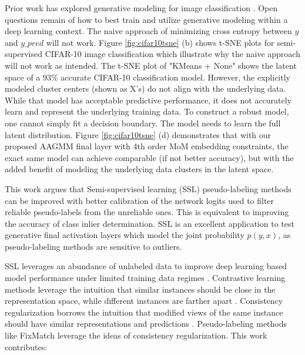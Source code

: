 \documentclass[10pt,twocolumn,letterpaper]{article}
\begin{document}
Prior work has explored generative modeling for image classification \cite{li2019disentangled,kingma2013auto,kingma2019introduction}.
Open questions remain of how to best train and utilize generative modeling within a deep learning context.
The naive approach of minimizing cross entropy between $y$ and $y\_pred$ will not work.
Figure \ref{fig:cifar10tsne} (b) shows t-SNE plots for semi-supervised CIFAR-10 \cite{cifar10} image classification which illustrate why the naive approach will not work as intended. 
The t-SNE\cite{tsne} plot of "KMeans + None" shows the latent space of a $93\%$ accurate CIFAR-10 classification model. 
However, the explicitly modeled cluster centers (shown as X's) do not align with the underlying data.
While that model has acceptable predictive performance, it does not accurately learn and represent the underlying training data.
To construct a robust model, one cannot simply fit a decision boundary.
The model needs to learn the full latent distribution. 
Figure \ref{fig:cifar10tsne} (d) demonstrates that with our proposed AAGMM final layer with 4th order MoM embedding constraints, the exact same model can achieve comparable (if not better accuracy), but with the added benefit of modeling the underlying data clusters in the latent space.


This work argues that Semi-supervised learning (SSL) pseudo-labeling methods can be improved with better calibration of the network logits used to filter reliable pseudo-labels from the unreliable ones. 
This is equivalent to improving the accuracy of class inlier determination.
SSL is an excellent application to test generative final activation layers which model the joint probability $p(y,x)$, as pseudo-labeling methods are sensitive to outliers.

SSL leverages an abundance of unlabeled data to improve deep learning based model performance under limited training data regimes \cite{zhu2022introduction,li2019safe,hady2013semi}.
Contrastive learning methods leverage the intuition that similar instances should be close in the representation space, while different instances are farther apart \cite{yang2022class,li2021comatch}.
Consistency regularization borrows the intuition that modified views of the same instance should have similar representations and predictions \cite{sohn2020fixmatch,lee2022contrastive,zhang2021flexmatch,kim2022conmatch}.
Pseudo-labeling methods like FixMatch \cite{sohn2020fixmatch} leverage the ideas of consistency regularization.
This work contributes:
\end{document}

